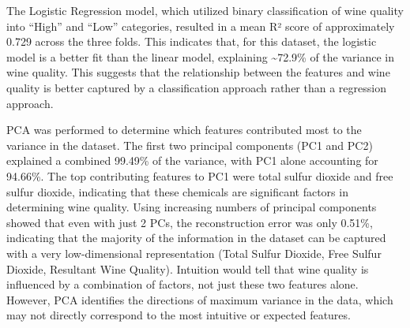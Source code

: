 The Logistic Regression model, which utilized binary classification of wine quality into ``High'' and ``Low'' categories, resulted in a mean R² score of approximately 0.729 across the three folds.
This indicates that, for this dataset, the logistic model is a better fit than the linear model, explaining \textasciitilde{72.9}\% of the variance in wine quality.
This suggests that the relationship between the features and wine quality is better captured by a classification approach rather than a regression approach.

PCA was performed to determine which features contributed most to the variance in the dataset.
The first two principal components (PC1 and PC2) explained a combined 99.49\% of the variance, with PC1 alone accounting for 94.66\%.
The top contributing features to PC1 were total sulfur dioxide and free sulfur dioxide, indicating that these chemicals are significant factors in determining wine quality.
Using increasing numbers of principal components showed that even with just 2 PCs, the reconstruction error was only 0.51\%, 
indicating that the majority of the information in the dataset can be captured with a very low-dimensional representation (Total Sulfur Dioxide, Free Sulfur Dioxide, Resultant Wine Quality).
Intuition would tell that wine quality is influenced by a combination of factors, not just these two features alone. 
However, PCA identifies the directions of maximum variance in the data, which may not directly correspond to the most intuitive or expected features.